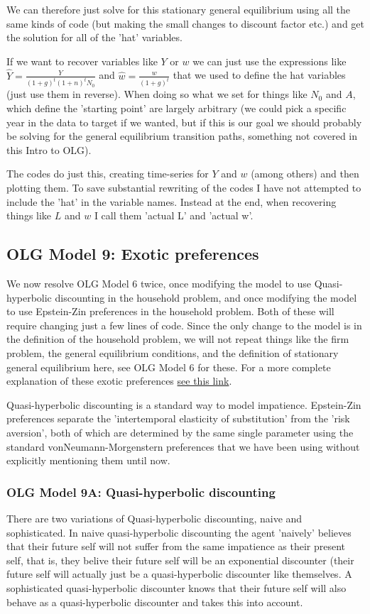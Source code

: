 We can therefore just solve for this stationary general equilibrium using all the same kinds of code (but making the small changes to discount factor etc.) and get the solution for all of the 'hat' variables.

If we want to recover variables like $Y$ or $w$ we can just use the expressions like $\hat{Y} =\frac{Y}{(1+g)^t (1+n)^t N_0}$ and $\hat{w} = \frac{w}{(1+g)^t}$ that we used to define the hat variables (just use them in reverse). When doing so what we set for things like $N_0$ and $A$, which define the 'starting point' are largely arbitrary (we could pick a specific year in the data to target if we wanted, but if this is our goal we should probably be solving for the general equilibrium transition paths, something not covered in this Intro to OLG).

The codes do just this, creating time-series for $Y$ and $w$ (among others) and then plotting them. To save substantial rewriting of the codes I have not attempted to include the 'hat' in the variable names. Instead at the end, when recovering things like $L$ and $w$ I call them 'actual L' and 'actual w'.


\subsection{OLG Model 9: Exotic preferences}
We now resolve OLG Model 6 twice, once modifying the model to use Quasi-hyperbolic discounting in the household problem, and once modifying the model to use Epstein-Zin preferences in the household problem. Both of these will require changing just a few lines of code. Since the only change to the model is in the definition of the household problem, we will not repeat things like the firm problem, the general equilibrium conditions, and the definition of stationary general equilibrium here, see OLG Model 6 for these. For a more complete explanation of these exotic preferences \textcolor{blue}{\href{https://www.vfitoolkit.com/updates-blog/2021/exotic-preferences-epstein-zin-quasi-hyperbolic/}{see this link}}.

Quasi-hyperbolic discounting is a standard way to model impatience. Epstein-Zin preferences separate the 'intertemporal elasticity of substitution' from the 'risk aversion', both of which are determined by the same single parameter using the standard vonNeumann-Morgenstern preferences that we have been using without explicitly mentioning them until now.

\subsubsection{OLG Model 9A: Quasi-hyperbolic discounting}
There are two variations of Quasi-hyperbolic discounting, naive and sophisticated. In naive quasi-hyperbolic discounting the agent 'naively' believes that their future self will not suffer from the same impatience as their present self, that is, they belive their future self will be an exponential discounter (their future self will actually just be a quasi-hyperbolic discounter like themselves. A sophisticated quasi-hyperbolic discounter knows that their future self will also behave as a quasi-hyperbolic discounter and takes this into account.

